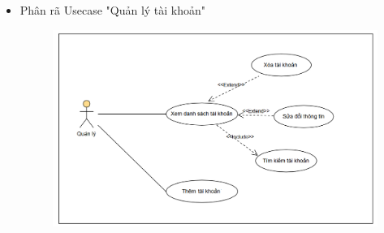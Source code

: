 \documentclass{article}
\begin{document}
\begin{itemize}
\begin{figure}[H]
    \end{figure}
    \newpage
    \item Phân rã Usecase "Quản lý tài khoản"
    \begin{figure}[H]
        \centering
        \includegraphics[width=1\textwidth]{Ảnh chương 2/Tài khoản.png}
    \end{figure}
\end{itemize}
\end{document}
